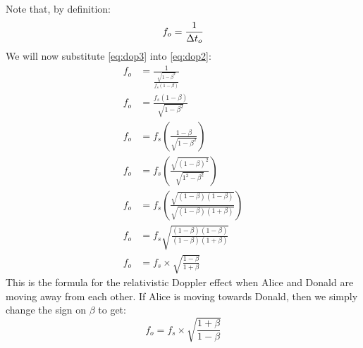 		Note that, by definition:
		\begin{equation}\label{eq:dop2}
			f_o = \frac{1}{\mathrm{\Delta} t_o}
		\end{equation}
		We will now substitute \eqref{eq:dop3} into \eqref{eq:dop2}:
		\begin{align}
			f_o &= \frac{1}{\frac{\sqrt{1 - \beta^2}}{f_s(1 - \beta)}}\nonumber\\
			f_o &= \frac{f_s(1 - \beta)}{\sqrt{1 - \beta^2}}\nonumber\\
			f_o &= f_s\left(\frac{1 - \beta}{\sqrt{1 - \beta^2}}\right)\nonumber\\
			f_o &= f_s\left(\frac{\sqrt{(1 - \beta)^2}}{\sqrt{1^2 - \beta^2}}\right)\nonumber\\
			f_o &= f_s\left(\frac{\sqrt{(1 - \beta)(1 - \beta)}}{\sqrt{(1 - \beta)(1 + \beta)}}\right)\nonumber\\
			f_o &= f_s\sqrt{\frac{(1 - \beta)(1 - \beta)}{(1 - \beta)(1 + \beta)}}\nonumber\\
			f_o &= f_s \times \sqrt{\frac{1 - \beta}{1 + \beta}}\label{eq:relDopAway}
		\end{align}
		This is the formula for the relativistic Doppler effect when Alice and Donald are moving away from each other.
		If Alice is moving towards Donald, then we simply change the sign on $\beta$ to get:
		\begin{equation}\label{eq:relDopTowards}
			f_o = f_s \times \sqrt{\frac{1 + \beta}{1 - \beta}}
		\end{equation}
